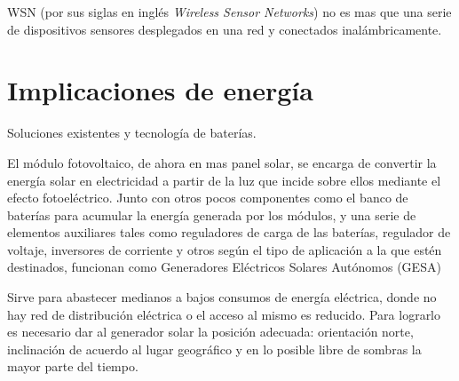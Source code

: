 WSN (por sus siglas en inglés \textit{Wireless Sensor Networks}) no es mas que una serie de dispositivos sensores desplegados en una red y conectados inalámbricamente.


\section{Implicaciones de energía}
\label{sec:energía}

Soluciones existentes y tecnología de baterías.

El módulo fotovoltaico, de ahora en mas panel solar, se encarga de convertir la energía solar en electricidad a partir de la luz que incide sobre ellos mediante el efecto fotoeléctrico. Junto con otros pocos componentes como el banco de baterías para acumular la energía generada por los módulos, y una serie de elementos auxiliares tales como reguladores de carga de las baterías, regulador de voltaje, inversores de corriente y otros según el tipo de aplicación a la que estén destinados, funcionan como Generadores Eléctricos Solares Autónomos (GESA)

Sirve para abastecer medianos a bajos consumos de energía eléctrica, donde no hay red de distribución eléctrica o el acceso al mismo es reducido. Para lograrlo es necesario dar al generador solar la posición adecuada: orientación norte, inclinación de acuerdo al lugar geográfico y en lo posible libre de sombras la mayor parte del tiempo.


